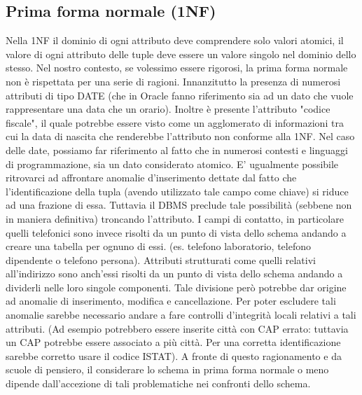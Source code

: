 \documentclass[12pt]{report}
\begin{document}
\subsection*{Prima forma normale (1NF)}
Nella 1NF il dominio di ogni attributo deve comprendere solo valori atomici, il valore di ogni attributo delle tuple deve essere un valore singolo nel dominio dello stesso.
\newline\newline
Nel nostro contesto, se volessimo essere rigorosi, la prima forma normale non è rispettata per una serie di ragioni. Innanzitutto la presenza di numerosi attributi di tipo DATE (che in Oracle fanno riferimento sia ad un dato che vuole rappresentare una data che un orario). Inoltre è presente l'attributo "codice fiscale", il quale potrebbe essere visto come un agglomerato di informazioni tra cui la data di nascita che renderebbe l'attributo non conforme alla 1NF.
\newline\newline
Nel caso delle date, possiamo far riferimento al fatto che in numerosi contesti e linguaggi di programmazione, sia un dato considerato atomico. E' ugualmente possibile ritrovarci ad affrontare anomalie d'inserimento dettate dal fatto che l'identificazione della tupla (avendo utilizzato tale campo come chiave) si riduce ad una frazione di essa. Tuttavia il DBMS preclude tale possibilità (sebbene non in maniera definitiva) troncando l'attributo. I campi di contatto, in particolare quelli telefonici sono invece risolti da un punto di vista dello schema andando a creare una tabella per ognuno di essi. (es. telefono laboratorio, telefono dipendente o telefono persona). Attributi strutturati come quelli relativi all'indirizzo sono anch'essi risolti da un punto di vista dello schema andando a dividerli nelle loro singole componenti. Tale divisione però potrebbe dar origine ad anomalie di inserimento, modifica e cancellazione. Per poter escludere tali anomalie sarebbe necessario andare a fare controlli d'integrità locali relativi a tali attributi. (Ad esempio potrebbero essere inserite città con CAP errato: tuttavia un CAP potrebbe essere associato a più città. Per una corretta identificazione sarebbe corretto usare il codice ISTAT).
\newline\newline
A fronte di questo ragionamento e da scuole di pensiero, il considerare lo schema in prima forma normale o meno dipende dall'accezione di tali problematiche nei confronti dello schema.
\end{document}
